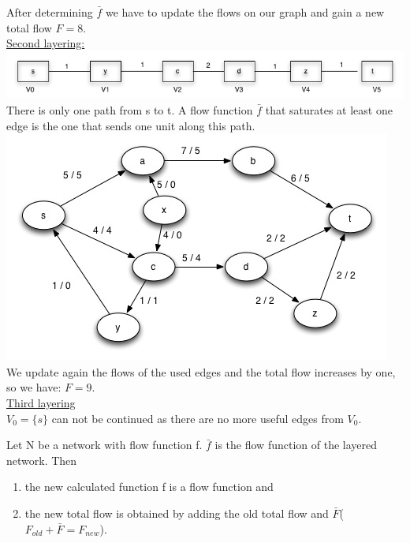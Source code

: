 \begin{example}
After determining $\bar{f}$ we have to update the flows on our graph and gain a new total flow $F=8$. \\
\underline{Second layering:} \\
\includegraphics{diagrams/Chapter3_Example_6_Layering2.jpg} \\ 
There is only one path from s to t. A flow function $\bar{f}$ that saturates at least one edge is the one that sends one unit along this path. \\
\includegraphics{diagrams/Chapter3_Example6_V3.jpg} \\
We update again the flows of the used edges and the total flow increases by one, so we have: $F=9$. \\
\underline{Third layering} \\
$V_0 = \{s\}$ can not be continued as there are no more useful edges from $V_0$.
\end{example}

\begin{lemma}
Let N be a network with flow function f. $\bar{f}$ is the flow function of the layered network. Then 
\begin{enumerate}
\item the new calculated function f is a flow function and
\item the new total flow is obtained by adding the old total flow and $\bar{F}$($F_{old} + \bar{F} = F_{new}$).
\end{enumerate}
\end{lemma}

